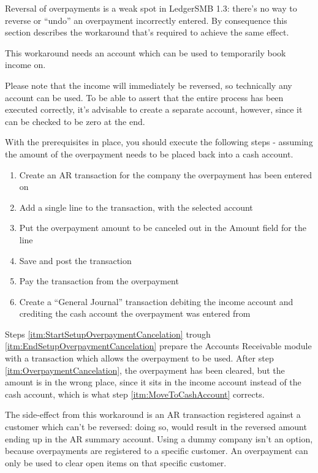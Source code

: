 Reversal of overpayments is a weak spot in LedgerSMB 1.3: there's no way
to reverse or ``undo'' an overpayment incorrectly entered.  By consequence
this section describes the workaround that's required to achieve the same
effect.

This workaround needs an account which can be used to temporarily book income on.

Please note that the income will immediately be reversed, so
technically any account can be used.  To be able to assert that the entire process
has been executed correctly, it's advisable to create a separate account, however, since
it can be checked to be zero at the end.

With the prerequisites in place, you should execute the following steps - assuming the amount
of the overpayment needs to be placed back into a cash account.

\begin{enumerate}
\item \label{itm:StartSetupOverpaymentCancelation} Create an AR transaction for the
    company the overpayment has been entered on
\item Add a single line to the transaction, with the selected account
\item Put the overpayment amount to be canceled out in the Amount field for the line
\item \label{itm:EndSetupOverpaymentCancelation} Save and post the transaction
\item \label{itm:OverpaymentCancelation} Pay the transaction from the overpayment
\item \label{itm:MoveToCashAccount} Create a ``General Journal'' transaction debiting the income account and crediting the
    cash account the overpayment was entered from
\end{enumerate}

Steps \ref{itm:StartSetupOverpaymentCancelation} trough \ref{itm:EndSetupOverpaymentCancelation}
prepare the Accounts Receivable module with a transaction which allows the overpayment to be used.
After step \ref{itm:OverpaymentCancelation}, the overpayment has been cleared, but the
amount is in the wrong place, since it sits in the income account instead of the cash account,
which is what step \ref{itm:MoveToCashAccount} corrects.

The side-effect from this workaround is an AR transaction registered against a customer which can't
be reversed: doing so, would result in the reversed amount ending up in the AR summary account.  Using
a dummy company isn't an option, because overpayments are registered to a specific customer.  An
overpayment can only be used to clear open items on that specific customer.

